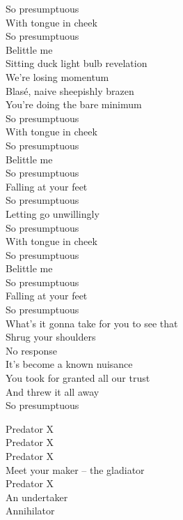 So presumptuous\\
With tongue in cheek\\
So presumptuous\\
Belittle me\\

Sitting duck light bulb revelation\\
We're losing momentum\\
Blasé, naive sheepishly brazen\\
You're doing the bare minimum\\

So presumptuous\\
With tongue in cheek\\
So presumptuous\\
Belittle me\\
So presumptuous\\
Falling at your feet\\
So presumptuous\\
Letting go unwillingly\\

So presumptuous\\
With tongue in cheek\\
So presumptuous\\
Belittle me\\
So presumptuous\\
Falling at your feet\\
So presumptuous\\
What's it gonna take for you to see that\\

Shrug your shoulders\\
No response\\
It's become a known nuisance\\
You took for granted all our trust\\
And threw it all away\\
So presumptuous\\




Predator X\\
Predator X\\
Predator X\\
Meet your maker -- the gladiator\\
Predator X\\
An undertaker\\
Annihilator\\

